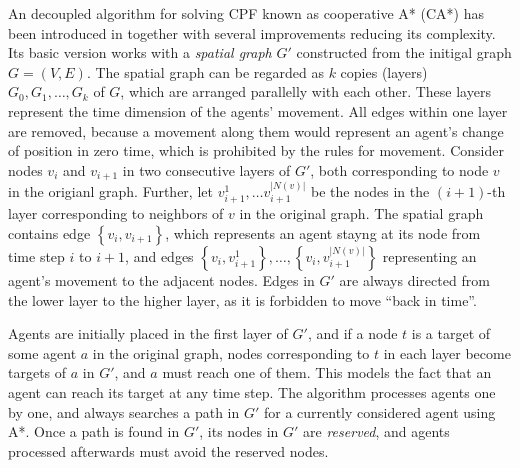 An decoupled algorithm for solving CPF known as cooperative A* (CA*) has been introduced in \cite{silver05} together with several improvements reducing its complexity.
Its basic version works with a \emph{spatial graph} $G'$ constructed from the initigal graph $G=(V, E)$.
The spatial graph can be regarded as $k$ copies (layers) $G_0, G_1,\dots,G_k$ of $G$, which are arranged parallelly with each other.
These layers represent the time dimension of the agents' movement.
All edges within one layer are removed, because a movement along them would represent an agent's change of position in zero time, which is prohibited by the rules for movement.
Consider nodes $v_i$ and $v_{i+1}$ in two consecutive layers of $G'$, both corresponding to node $v$ in the origianl graph.
Further, let $v_{i+1}^1,\dots v_{i+1}^{|N(v)|}$ be the nodes in the $(i+1)$-th layer corresponding to neighbors of $v$ in the original graph.
The spatial graph contains edge $\left\{v_i,v_{i+1}\right\}$, which represents an agent stayng at its node from time step $i$ to $i+1$, 
and edges $\left\{v_i,v_{i+1}^{1}\right\},\dots,\left\{v_i,v_{i+1}^{|N(v)|}\right\}$ representing an agent's movement to the adjacent nodes.
Edges in $G'$ are always directed from the lower layer to the higher layer, as it is forbidden to move ``back in time''.

Agents are initially placed in the first layer of $G'$, and if a node $t$ is a target of some agent $a$ in the original graph, nodes corresponding to $t$ in each layer become targets of $a$ in $G'$,
and $a$ must reach one of them.
This models the fact that an agent can reach its target at any time step.
The algorithm processes agents one by one, and always searches a path in $G'$ for a currently considered agent using A*.
Once a path is found in $G'$, its nodes in $G'$ are \emph{reserved}, and agents processed afterwards must avoid the reserved nodes.

